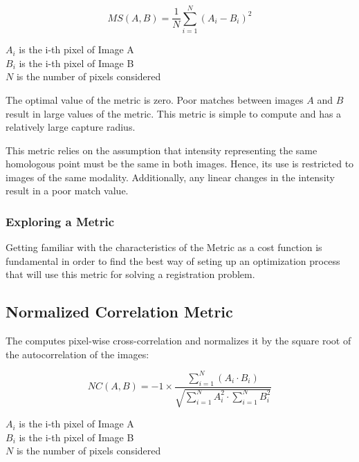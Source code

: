 \begin{equation}
MS(A,B) = \frac{1}{N} \sum_{i=1}^N \left( A_i - B_i \right)^2
\end{equation}
\begin{center}
$A_i$ is the i-th pixel of Image A\\ 
$B_i$ is the i-th pixel of Image B\\
$N$ is the number of pixels considered
\end{center}

The optimal value of the metric is zero. Poor matches between images $A$ and
$B$ result in large values of the metric. This metric is simple to compute and
has a relatively large capture radius.

This metric relies on the assumption that intensity representing the same
homologous point must be the same in both images. Hence, its use is restricted
to images of the same modality. Additionally, any linear changes in the
intensity result in a poor match value.

\subsubsection{Exploring a Metric}
\label{sec:ExploringAMetric}

Getting familiar with the characteristics of the Metric as a cost function is
fundamental in order to find the best way of seting up an optimization process
that will use this metric for solving a registration problem. 

\ifitkFullVersion

\fi


\subsection{Normalized Correlation Metric}
\label{sec:NormalizedCorrelationMetric}

The  computes pixel-wise
cross-correlation and normalizes it by the square root of the autocorrelation
of the images:

\begin{equation}
NC(A,B) = -1 \times \frac{ \sum_{i=1}^N \left( A_i \cdot B_i \right) }
        { \sqrt { \sum_{i=1}^N A_i^2  \cdot \sum_{i=1}^N B_i^2 } }
\end{equation}
\begin{center}
$A_i$ is the i-th pixel of Image A\\ 
$B_i$ is the i-th pixel of Image B\\
$N$ is the number of pixels considered
\end{center}

